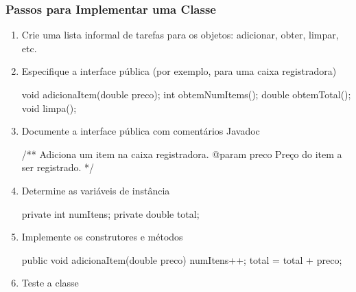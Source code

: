 \documentclass[xcolor={dvipsnames,table},aspectratio=169]{beamer}
\begin{document}
\begin{frame}[fragile]\frametitle{Passos para Implementar uma Classe}
\begin{enumerate}
	\item Crie uma lista informal de tarefas para os objetos: adicionar, obter, limpar, etc.
	\item Especifique a interface pública (por exemplo, para uma caixa registradora)
{\tiny
\begin{javacode}
void adicionaItem(double preco);    int obtemNumItems();    double obtemTotal();    	void limpa();
\end{javacode}
}
	\item Documente a interface pública com comentários Javadoc
{\tiny
\begin{javacode}
/** Adiciona um item na caixa registradora.
    @param preco Preço do item a ser registrado. */
\end{javacode}
}
	\item Determine as variáveis de instância
{\tiny
\begin{javacode}
private int numItens;                       private double total;
\end{javacode}
}
	\item Implemente os construtores e métodos
{\tiny
\begin{javacode}
public void adicionaItem(double preco) {  numItens++; total = total + preco; }
\end{javacode}
}
	\item Teste a classe
\end{enumerate}
\end{frame}
\end{document}
